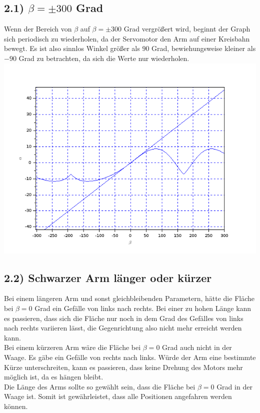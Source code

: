 \subsection*{2.1) $\beta = \pm 300$ Grad}
Wenn der Bereich von $\beta$ auf $\beta=\pm300$ Grad vergrößert wird, beginnt der Graph sich periodisch zu wiederholen, da der Servomotor den Arm auf einer Kreisbahn bewegt. Es ist also sinnlos Winkel größer als $90$ Grad, bewiehungsweise kleiner als $-90$ Grad zu betrachten, da sich die Werte nur wiederholen. \\
\includegraphics[scale=0.5]{images/plot2.png}

\subsection*{2.2) Schwarzer Arm länger oder kürzer}
Bei einem längeren Arm und sonst gleichbleibenden Parametern, hätte die Fläche bei $\beta = 0$ Grad ein Gefälle von links nach rechts. Bei einer zu hohen Länge kann es passieren, dass sich die Fläche nur noch in dem Grad des Gefälles von links nach rechts variieren lässt, die Gegenrichtung also nicht mehr erreicht werden kann. \\
Bei einem kürzeren Arm wäre die Fläche bei $\beta = 0$ Grad auch nicht in der Waage. Es gäbe ein Gefälle von rechts nach links. Würde der Arm eine bestimmte Kürze unterschreiten, kann es passieren, dass keine Drehung des Motors mehr möglich ist, da es hängen bleibt. \\
Die Länge des Arms sollte so gewählt sein, dass die Fläche bei $\beta = 0$ Grad in der Waage ist. Somit ist gewährleistet, dass alle Positionen angefahren werden können.